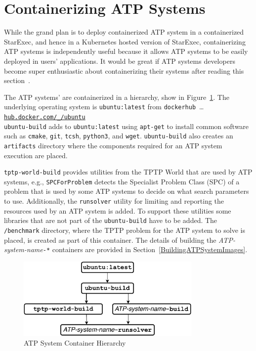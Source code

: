 \documentclass{easychair}
\begin{document}
\section{Containerizing ATP Systems}
\label{ContainerizingATPSystems}

While the grand plan is to deploy containerized ATP system in a containerized StarExec, and hence
in a Kubernetes hosted version of StarExec, containerizing ATP systems is independently useful 
because it allows ATP systems to be easily deployed in users' applications.
It would be great if ATP systems developers become super enthusiastic about containerizing their 
systems after reading this section~\smiley.

The ATP systems' are containerized in a hierarchy, show in Figure~\ref{ImageDAG}.
The underlying operating system is {\tt ubuntu:latest} from {\tt dockerhub}~\ldots\\
\hspace*{1cm}\href{https://hub.docker.com/_/ubuntu}{\tt hub.docker.com/\_/ubuntu} \\
{\tt ubuntu-build} adds to {\tt ubuntu:latest} using {\tt apt-get} to install common software such 
as {\tt cmake}, {\tt git}, {\tt tcsh}, {\tt python3}, and {\tt wget}.
{\tt ubuntu-build} also creates an {\tt artifacts} directory where the components required for 
an ATP system execution are placed.

{\tt tptp-world-build} provides utilities from the TPTP World \cite{Sut24} that are used by 
ATP systems, e.g., {\tt SPCForProblem} detects the Specialist Problem Class (SPC) \cite{SS01} of 
a problem that is used by some ATP systems to decide on what search parameters to use.
Additionally, the {\tt runsolver} utility for limiting and reporting the resources
used by an ATP system is added.
To support these utilities some libraries that are not part of the {\tt ubuntu-build} have
to be added.
The {\tt /benchmark} directory, where the TPTP problem for the ATP system to solve is placed, is
created as part of this container.
The details of building the {\em ATP-system-name}{\tt -*} containers are provided in
Section~\ref{BuildingATPSystemImages}.

\begin{figure}[htb]
\begin{center}
\includegraphics[width=0.8\textwidth]{ImageDAG} 
\caption{ATP System Container Hierarchy}
\label{ImageDAG}
\end{center}
\end{figure}
\end{document}
